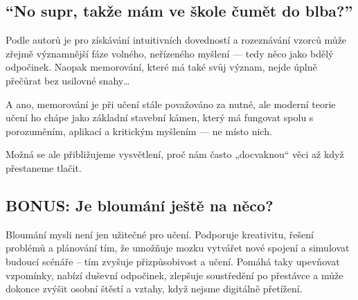\documentclass[main.tex]{subfiles}
\begin{document}
\subsection*{\enquote{No supr, takže mám ve škole čumět do blba?}}
Podle autorů je pro získávání intuitivních dovedností a rozeznávání vzorců může zřejmě významnější fáze volného, neřízeného myšlení — tedy něco jako bdělý odpočinek. Naopak memorování, které má také svůj význam, nejde úplně přečůrat bez usilovné snahy…\par
A ano, memorování je při učení stále považováno za nutné, ale moderní teorie učení ho chápe jako základní stavební kámen, který má fungovat spolu s porozuměním, aplikací a kritickým myšlením — ne místo nich.\par
Možná se ale přibližujeme vysvětlení, proč nám často „docvaknou“ věci až když přestaneme tlačit.
\subsection*{BONUS: Je bloumání ještě na něco?}
Bloumání mysli není jen užitečné pro učení. Podporuje kreativitu, řešení problémů a plánování tím, že umožňuje mozku vytvářet nové spojení a simulovat budoucí scénáře – tím zvyšuje přizpůsobivost a učení. Pomáhá taky upevňovat vzpomínky, nabízí duševní odpočinek, zlepšuje soustředění po přestávce a může dokonce zvýšit osobní štěstí a vztahy, když nejsme digitálně přetížení.
\newpage
\end{document}
